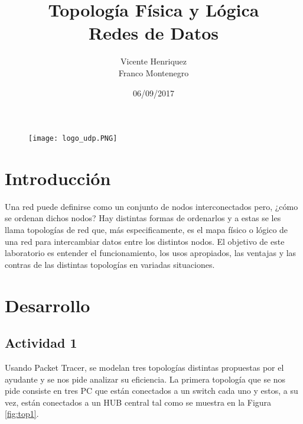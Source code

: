 \documentclass{article}
\begin{document}
\begin{figure}[t!]
\texttt{[image: logo\_udp.PNG]}
\label{fig:udplogo}
\end{figure}

\title{\textbf{{Topología Física y Lógica \\ Redes de Datos \vspace{10cm}}}}
\author{\hspace{8cm} Vicente Henriquez \\ \hspace{8cm} Franco Montenegro}
\date{\hspace{8cm} 06/09/2017}
\maketitle

\newpage
\tableofcontents

\newpage
\section{Introducción \vspace{0.5cm}}
Una red puede definirse como un conjunto de nodos interconectados pero, ¿cómo se ordenan dichos nodos?
\newline Hay distintas formas de ordenarlos y a estas se les llama topologías de red que, más especificamente, es el mapa físico o lógico de una red para intercambiar datos entre los distintos nodos.
\newline El objetivo de este laboratorio es entender el funcionamiento, los usos apropiados, las ventajas y las contras de las distintas topologías en variadas situaciones.
\newpage
\section{Desarrollo \vspace{0.5cm}}
\subsection{Actividad 1 \vspace{0.3cm}}
Usando Packet Tracer, se modelan tres topologías distintas propuestas por el ayudante y se nos pide analizar su eficiencia.\newline
La primera topología que se nos pide consiste en tres PC que están conectados a un switch cada uno y estos, a su vez, están conectados a un HUB central tal como se muestra en la Figura \ref{fig:top1}.
\end{document}
